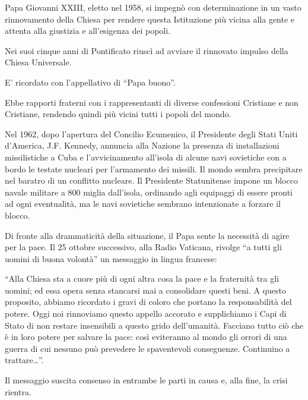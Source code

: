 Papa Giovanni XXIII, eletto nel 1958, si impegnò con determinazione in un vasto rinnovamento della Chiesa per rendere questa Istituzione più vicina alla gente e attenta alla giustizia e all’esigenza dei popoli.

Nei suoi cinque anni di Pontificato riuscì ad avviare il rinnovato impulso della Chiesa Universale.

E’ ricordato con l’appellativo di “Papa buono”.

Ebbe rapporti fraterni con i rappresentanti di diverse confessioni Cristiane e non Cristiane, rendendo  quindi più vicini tutti i popoli del mondo.

Nel 1962, dopo l’apertura del Concilio Ecumenico, il Presidente degli Stati Uniti d’America, J.F. Kennedy, annuncia alla Nazione la presenza di installazioni missilistiche a Cuba e l’avvicinamento all’isola di alcune navi sovietiche con a bordo le testate nucleari per l’armamento dei missili. Il mondo sembra precipitare nel baratro di un conflitto nucleare. Il Presidente Statunitense impone un blocco navale militare a 800 miglia dall’isola, ordinando agli equipaggi di essere pronti ad ogni eventualità, ma le navi sovietiche sembrano intenzionate a forzare il blocco.

Di fronte alla drammaticità della situazione, il Papa sente la necessità di agire per la pace. Il 25 ottobre successivo, alla Radio Vaticana, rivolge “a tutti gli uomini di buona volontà” un messaggio in lingua francese:

“Alla Chiesa sta a cuore più di ogni altra cosa la pace e la fraternità tra gli uomini; ed essa opera senza stancarsi mai a consolidare questi beni.  A questo proposito, abbiamo ricordato i gravi di coloro che portano la responsabilità del potere. Oggi noi rinnoviamo questo appello accorato e supplichiamo i Capi di Stato di non restare insensibili a questo grido dell’umanità. Facciano tutto ciò che è in loro potere per salvare la pace: così eviteranno al mondo gli orrori di una guerra di cui nessuno può prevedere le spaventevoli conseguenze.
Continuino a trattare…”.

Il messaggio suscita consenso in entrambe le parti in causa e, alla fine, la crisi rientra.
